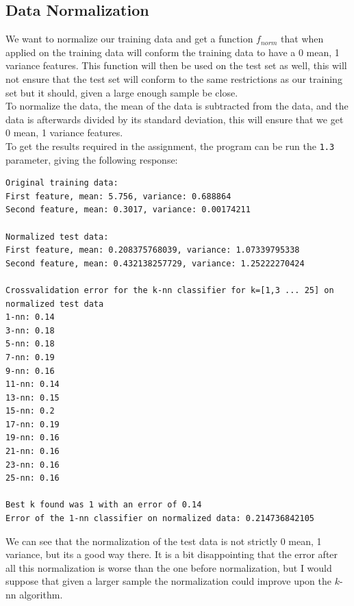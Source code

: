 \documentclass[a4paper]{article}
\begin{document}
\subsection{Data Normalization}
We want to normalize our training data and get a function $f_{norm}$ that when applied on the training data will conform the training data to have a 0 mean, 1 variance features. This function will then be used on the test set as well, this will not ensure that the test set will conform to the same restrictions as our training set but it should, given a large enough sample be close. \\
To normalize the data, the mean of the data is subtracted from the data, and the data is afterwards divided by its standard deviation, this will ensure that we get 0 mean, 1 variance features.\\
To get the results required in the assignment, the program can be run the \texttt{1.3} parameter, giving the following response:
\begin{lstlisting}
Original training data:
First feature, mean: 5.756, variance: 0.688864
Second feature, mean: 0.3017, variance: 0.00174211

Normalized test data:
First feature, mean: 0.208375768039, variance: 1.07339795338
Second feature, mean: 0.432138257729, variance: 1.25222270424

Crossvalidation error for the k-nn classifier for k=[1,3 ... 25] on normalized test data
1-nn: 0.14
3-nn: 0.18
5-nn: 0.18
7-nn: 0.19
9-nn: 0.16
11-nn: 0.14
13-nn: 0.15
15-nn: 0.2
17-nn: 0.19
19-nn: 0.16
21-nn: 0.16
23-nn: 0.16
25-nn: 0.16

Best k found was 1 with an error of 0.14
Error of the 1-nn classifier on normalized data: 0.214736842105
\end{lstlisting}
We can see that the normalization of the test data is not strictly 0 mean, 1 variance, but its a good way there. It is a bit disappointing that the error after all this normalization is worse than the one before normalization, but I would suppose that given a larger sample the normalization could improve upon the $k$-nn algorithm.
\end{document}

